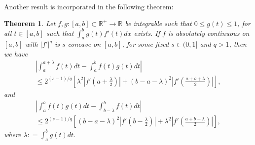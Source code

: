 \documentclass{amsart}
\newtheorem{theorem}{Theorem}
\theoremstyle{plain}
\numberwithin{equation}{section}
\begin{document}
Another result is incorporated in the following theorem:
\begin{theorem}
\label{thm.main3}Let $f,g: [a,b]\subset \mathbb{R}^{+} \to
\mathbb{R}$ be integrable such that $0 \le g(t) \le 1$, for all $t
\in [a,b]$ such that $\int_a^b {g\left( t \right)f'\left( t
\right)dx}$ exists. If $f$ is absolutely continuous on $[a,b]$
with $|f'|^q$ is $s$-concave on $[a,b]$, for some fixed $s\in
(0,1]$ and $q>1$, then we have
\begin{multline}
\label{eq2.12}\left| {\int_a^{a + \lambda } {f\left( t \right)dt -
\int_a^b {f\left( t \right)g\left( t \right)dt} } } \right|
\\
\le 2^{\left( {s - 1} \right)/q} \left[ { \lambda^2 \left|
{f'\left( {a + \frac{\lambda }{2}} \right)} \right|  + \left( {b -
a - \lambda } \right)^2 \left| {f'\left( {\frac{{a + b + \lambda
}}{2}} \right)} \right| } \right],
\end{multline}
and
\begin{multline}
\label{eq2.13}\left| {\int_a^b {f\left( t \right)g\left( t
\right)dt} - \int_{b - \lambda }^b {f\left( t \right)dt } }
\right|
\\
\le 2^{\left( {s - 1} \right)/q} \left[ { \left( {b - a - \lambda
} \right)^2 \left| {f'\left( {b - \frac{\lambda }{2}} \right)}
\right|  +  \lambda^2\left| {f'\left( {\frac{{a + b - \lambda
}}{2}} \right)} \right|  } \right],
\end{multline}
where $\lambda : = \int_a^b {g\left( t \right)dt}$.
\end{theorem}
\end{document}
